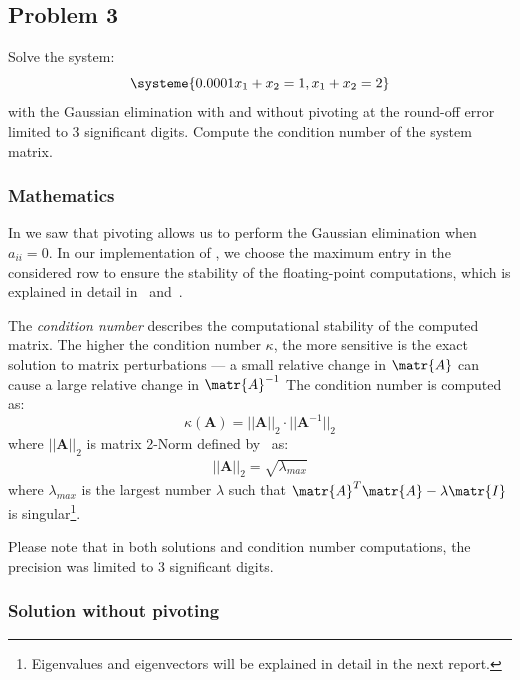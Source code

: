 \subsection{Problem 3}

Solve the system:
\begin{equation*}
    \systeme{0.0001x_1+x_2=1,x_1+x_2=2}
\end{equation*}
with the Gaussian elimination with and without pivoting at the round-off error limited to 3 significant digits. Compute the condition number of the system matrix.

\subsubsection*{Mathematics}

In  we saw that pivoting allows us to perform the Gaussian elimination when $a_{ii}=0$.
In our implementation of , we choose the maximum entry in the considered row to ensure the stability of the floating-point computations, which is explained in detail in~\cite[section 3.3]{GoluVanl96} and~\cite[section 1.5]{Meyer}.

The \textit{condition number} describes the computational stability of the computed matrix.
The higher the condition number $\kappa$, the more sensitive is the exact solution to matrix perturbations --- a small relative change in $\matr{A}$ can cause a large relative change in $\matr{A}^{-1}$
The condition number is computed as:
\begin{equation}
    \kappa(\mathbf{A})=||\mathbf{A}||_2\cdot||\mathbf{A}^{-1}||_2
\end{equation}
where $||\mathbf{A}||_2$ is matrix 2-Norm defined by~\cite[equation 5.2.7]{Meyer} as:
\begin{equation}\label{eqn:2-norm}
\begin{split}
    ||\mathbf{A}||_2 = \sqrt{\lambda_{max}}
\end{split}
\end{equation}
where $\lambda_{max}$ is the largest number $\lambda$ such that $\matr{A}^T\matr{A}-\lambda\matr{I}$ is singular\footnote{Eigenvalues and eigenvectors will be explained in detail in the next report.}.

Please note that in both solutions and condition number computations, the precision was limited to 3 significant digits.

\subsubsection*{Solution without pivoting}

